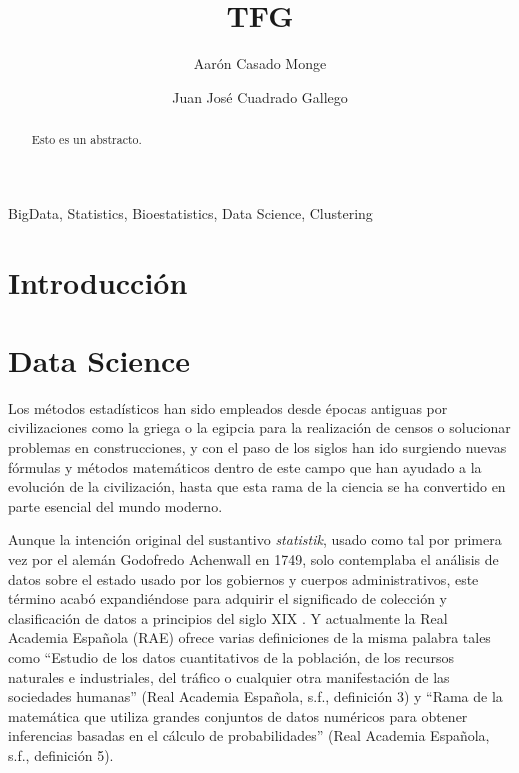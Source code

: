 \documentclass[3p,twocolumn]{elsarticle}
\begin{document}
\title{TFG}
\author[1]{Aarón Casado Monge}
\author[2]{Juan José Cuadrado Gallego}

\address{University of Alcala, Polytechnic School, Computer Science Department, Scientific and Technological Campus, Politechnic Building. Office: O243, 28805, Alcala de Henares, Madrid, Spain}

\begin{abstract}
Esto es un abstracto.
\end{abstract}

\begin{keyword}
BigData, Statistics, Bioestatistics, Data Science, Clustering
\end{keyword}

\maketitle

\section{Introducción}

\section{Data Science}
Los métodos estadísticos han sido empleados desde épocas antiguas por civilizaciones como la griega o la egipcia para la realización de censos o solucionar problemas en construcciones, y con el paso de los siglos han ido surgiendo nuevas fórmulas y métodos matemáticos dentro de este campo que han ayudado a la evolución de la civilización, hasta que esta rama de la ciencia se ha convertido en parte esencial del mundo moderno.

Aunque la intención original del sustantivo \textit{statistik}, usado como tal por primera vez por el alemán Godofredo Achenwall en 1749, solo contemplaba el análisis de datos sobre el estado usado por los gobiernos y cuerpos administrativos, este término acabó expandiéndose para adquirir el significado de colección y clasificación de datos a principios del siglo XIX \cite{cita1} \cite{cita2}. Y actualmente la Real Academia Española (RAE) ofrece varias definiciones de la misma palabra tales como ``Estudio de los datos cuantitativos de la población, de los recursos naturales e industriales, del tráfico o cualquier otra manifestación de las sociedades humanas'' (Real Academia Española, s.f., definición 3) y ``Rama de la matemática que utiliza grandes conjuntos de datos numéricos para obtener inferencias basadas en el cálculo de probabilidades'' (Real Academia Española, s.f., definición 5).
\end{document}

